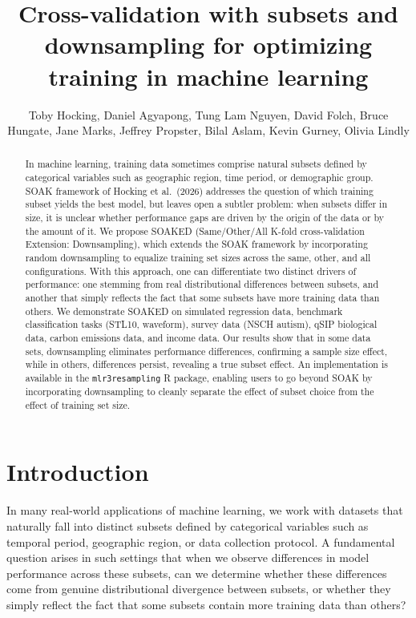\documentclass{article}
\title{Cross-validation with subsets and downsampling for optimizing training in machine learning}
\author{Toby Hocking, 
Daniel Agyapong, Tung Lam Nguyen, David Folch, Bruce Hungate, Jane Marks, Jeffrey Propster, Bilal Aslam, Kevin Gurney, Olivia Lindly
}
\begin{document}
\maketitle


\begin{abstract}
In machine learning, training data sometimes comprise natural subsets defined by categorical variables such as geographic region, time period, or demographic group. 
SOAK framework of Hocking et al.\ (2026) addresses the question of which training subset yields the best model, but leaves open a subtler problem: when subsets differ in size, it is unclear whether performance gaps are driven by the origin of the data or by the amount of it.
We propose SOAKED (Same/Other/All K-fold cross-validation Extension: Downsampling), which extends the SOAK framework by incorporating random downsampling to equalize training set sizes across the same, other, and all configurations. 
With this approach, one can differentiate two distinct drivers of performance: one stemming from real distributional differences between subsets, and another that simply reflects the fact that some subsets have more training data than others.
We demonstrate SOAKED on simulated regression data, benchmark classification tasks (STL10, waveform), survey data (NSCH autism), qSIP biological data, carbon emissions data, and income data. 
Our results show that in some data sets, downsampling eliminates performance differences, confirming a sample size effect, while in others, differences persist, revealing a true subset effect. 
An implementation is available in the \texttt{mlr3resampling} R package, enabling users to go beyond SOAK by incorporating downsampling to cleanly separate the effect of subset choice from the effect of training set size.
\end{abstract}


\section{Introduction}
In many real-world applications of machine learning, we work with datasets that naturally fall into distinct subsets defined by categorical variables such as temporal period, geographic region, or data collection protocol. 
A fundamental question arises in such settings that when we observe differences in model performance across these subsets, can we determine whether these differences come from genuine distributional divergence between subsets, or whether they simply reflect the fact that some subsets contain more training data than others?
\end{document}
